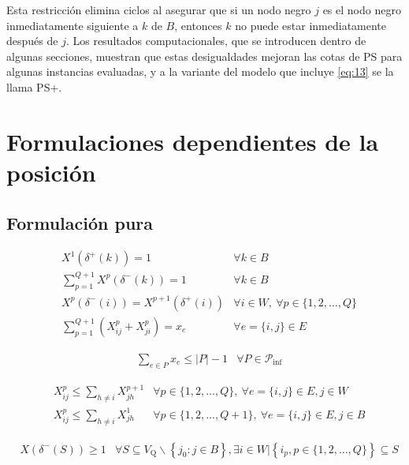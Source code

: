 \documentclass[10pt, a4paper]{article}
\theoremstyle{definition}
\begin{document}
Esta restricción elimina ciclos al asegurar que si un nodo negro $j$ es el nodo negro inmediatamente siguiente a $k$ de $B$, entonces $k$ no puede estar inmediatamente después de $j$. Los resultados computacionales, que se introducen dentro de algunas secciones, muestran que estas desigualdades mejoran las cotas de PS para algunas instancias evaluadas, y a la variante del modelo que incluye \ref{eq:13} se la llama PS+.

\section{Formulaciones dependientes de la posición}

\subsection{Formulación pura}

\begin{align}
	& X^{1}\left(\delta^{+}(k)\right)=1 & \forall k \in B \label{eq:14} \\
	& \sum_{p=1}^{Q+1} X^{p}\left(\delta^{-}(k)\right)=1 & \forall k \in B \label{eq:15} \\
	& X^{p}\left(\delta^{-}(i)\right)=X^{p+1}\left(\delta^{+}(i)\right) & \forall i \in W,\ \forall p \in\{1,2, \ldots, Q\} \label{eq:16} \\
	& \sum_{p=1}^{Q+1}\left(X_{i j}^{p}+X_{j i}^{p}\right)=x_{e} & \forall e=\{i, j\} \in E \label{eq:17}
\end{align}

\begin{align}
	& \sum_{e \in P} x_{e} \leq|P|-1 & \forall P \in \mathcal{P}_{\mathrm{inf}} \label{eq:18}
\end{align}

\begin{align}
	& X_{i j}^{p} \leq \sum_{h \neq i} X_{j h}^{p+1} & \forall p \in\{1,2, \ldots, Q\},\ \forall e=\{i, j\} \in E, j \in W \label{eq:19} \\
	& X_{i j}^{p} \leq \sum_{h \neq i} X_{j h}^{1} & \forall p \in\{1,2, \ldots, Q+1\},\ \forall e=\{i, j\} \in E, j \in B \label{eq:20}
\end{align}

\begin{align}
	& X\left(\delta^{-}(S)\right) \geq 1 & \forall S \subseteq V_{\mathrm{Q}} \backslash\left\{j_{0} : j \in B\right\}, \exists i \in W |\left\{i_{p}, p \in\{1,2, \ldots, Q\}\right\} \subseteq S \label{eq:21}
\end{align}
\end{document}
